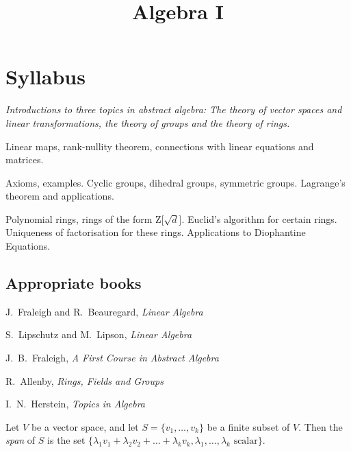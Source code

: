 \documentclass[twoside]{scrartcl}
\title{Algebra I}
\begin{document}
{


\section*{Syllabus}

\textit{Introductions to three topics in abstract algebra: The theory of vector spaces and linear
transformations, the theory of groups and the theory of rings.}



\vspace*{-5pt} Linear maps, rank-nullity theorem, connections with linear equations and matrices.

\vspace*{-5pt} Axioms, examples. Cyclic groups, dihedral groups, symmetric groups. Lagrange’s  theorem and applications.

\vspace*{-5pt}  Polynomial rings, rings of the form Z[$\sqrt{d}$]. Euclid’s algorithm for certain rings. Uniqueness of factorisation for these rings. Applications to Diophantine Equations.


\subsection*{Appropriate books}

{\shortskip
J.~Fraleigh and R.~Beauregard, \emph{Linear Algebra}

S.~Lipschutz and M.~Lipson, \emph{Linear Algebra}

J.~B.~Fraleigh, \emph{A First Course in Abstract Algebra}

R.~Allenby, \emph{Rings, Fields and Groups}

I.~N.~Herstein, \emph{Topics in Algebra}
}}

\TableofContents


\setcounter{lecture}{1}
\pagebreak
{}
\setcounter{page}{4}

Let   $V$ be a vector space, and let $S = \{v_1, \dots, v_k\}$ be a finite subset of $V$. Then the \emph{span} of $S$ is the set $\{\lambda_1v_1 + \lambda_2v_2 + \dots + \lambda_kv_k, \lambda_1,\dots,\lambda_k \text{ scalar}\}.$
\end{document}
